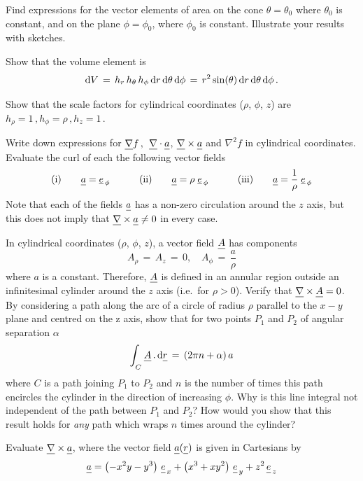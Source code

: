 \begin{ExerciseList}
  \Question Find expressions for the vector elements of area on the
  cone $\theta=\theta_0$ where $\theta_0$ is constant, and on the plane
  $\phi=\phi_0$, where $\phi_0$ is constant. Illustrate your results
  with sketches.

  \Question Show that the volume element is
  \[
    {\rm d}V
    \,=\,
    h_r \, h_\theta \, h_\phi \,{\rm d}r \, {\rm d}\theta \, {\rm d}\phi
    \,=\,
    r^2 \sin(\theta) \, {\rm d}r \, {\rm d}\theta \, {\rm d}\phi \,.
  \]

  \Exercise Show that the scale factors for cylindrical coordinates ($\rho$, $\phi$, $z$) are
  \(
  h_\rho {=} 1 \,,
  h_\phi {=} \rho \,,
  h_z {=} 1 \,. \)

  Write down expressions for $\grad f\,,\,$ $\Div \v{a}$, $\curl\v{a}$ and $\nabla^2f$ in
  cylindrical coordinates. Evaluate the curl of each the following vector fields
  \[
    \mbox{(i)}
    \qquad   \v{a} = \ephi
    \qquad\quad
    \mbox{(ii)}
    \qquad    \v{a} = \rho \; \ephi
    \qquad\quad
    \mbox{(iii)}
    \qquad   \v{a} = {\ds \frac{1}{\rho}} \; \ephi
  \]
  Note that each of the fields $\v{a}$ has a non-zero circulation around the $z$ axis, but
  this does not imply that $\curl\v{a}\neq0$ in every case.

  \Exercise In cylindrical coordinates ($\rho$, $\phi$, $z$), a vector
  field $\vA$ has components
  \[
    A_\rho \,=\, A_z \,=\, 0, \quad A_\phi \,=\, \frac{a}{\rho}
  \]
  where $a$ is a constant. Therefore, $\vA$ is defined in an annular region outside an
  infinitesimal cylinder around the $z$ axis (i.e.~for $\rho>0$). Verify that $\curl\vA=0$.
  By considering a path along the arc of a circle of radius $\rho$ parallel to the $x{-}y$
  plane and centred on the z axis, show that for two points $P_1$ and $P_2$ of angular
  separation $\alpha$
  \[
    \intC \vA \,.\, \dd\v{r}
    \,=\,
    \left(2\pi n + \alpha\right) a
  \]
  where $C$ is a path joining $P_1$ to $P_2$ and $n$ is the number of times this path
  encircles the cylinder in the direction of increasing $\phi$. Why is this line integral
  not independent of the path between $P_1$ and $P_2$? How would you show that this result
  holds for \emph{any} path which wraps $n$ times around the cylinder?

  \Exercise Evaluate $\curl\v{a}$,
  where the vector field $\v{a}(\v{r})$ is given in Cartesians by
  \[
    \v{a}
    =
    \left(-x^2y - y^3\right) \, \v{e}_{\,x}
    +
    \left(x^3  + xy^2\right)  \, \v{e}_{\,y}
    +
    z^2  \, \v{e}_{\,z}
  \]


\end{ExerciseList}
